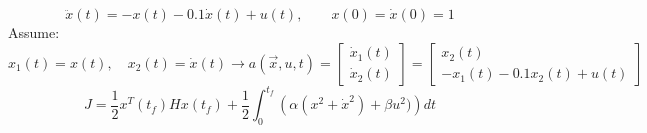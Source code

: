 $$\ddot x(t) = -x(t) - 0.1\dot x(t) + u(t), \qquad x(0) = \dot x(0) = 1 $$
Assume:
$$x_1(t) = x(t), \quad x_2(t) = \dot x(t) \to a(\vec x, u, t) =
 \begin{bmatrix}
	\dot x_1(t)\\
	\dot x_2(t)
\end{bmatrix}
= \begin{bmatrix}
	x_2(t)\\
	-x_1(t)- 0.1x_2(t) + u(t) 
\end{bmatrix}  $$
$$J = \dfrac 12 x^T(t_f)Hx(t_f) + \dfrac 12 \int_0^{t_f}\left(\alpha(x^2 + \dot x^2) + \beta u^2) \right)dt $$